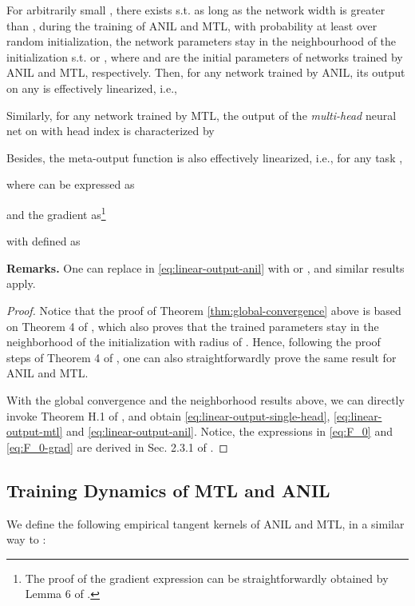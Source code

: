 \documentclass{article}
\begin{document}
\begin{corollary}\label{corollary:linearization}
For arbitrarily small , there exists  s.t. as long as the network width  is greater than , during the training of ANIL and MTL, with probability at least  over random initialization, the network parameters stay in the neighbourhood of the initialization s.t.  or , where  and  are the initial parameters of networks trained by ANIL and MTL, respectively. Then, for any network trained by ANIL, its output on any  is effectively linearized, i.e.,
    
Similarly, for any network trained by MTL, the output of the \textit{multi-head} neural net on  with head index  is characterized by
    
Besides, the meta-output function is also effectively linearized, i.e., for any task ,
    
where  can be expressed as
    
and the gradient  as\footnote{The proof of the gradient expression can be straightforwardly obtained by Lemma 6 of \cite{meta-ntk}.}
    
    with  defined as 
    
\end{corollary}
\textbf{Remarks.} One can replace  in \eqref{eq:linear-output-anil} with  or , and similar results apply.
\begin{proof}
    Notice that the proof of Theorem \ref{thm:global-convergence} above is based on Theorem 4 of \citet{meta-ntk}, which also proves that the trained parameters stay in the neighborhood of the initialization with radius of . Hence, following the proof steps of Theorem 4 of \citet{meta-ntk}, one can also straightforwardly prove the same result for ANIL and MTL.

    With the global convergence and the neighborhood results above, we can directly invoke Theorem H.1 of \citet{lee2019wide}, and obtain \eqref{eq:linear-output-single-head}, \eqref{eq:linear-output-mtl} and \eqref{eq:linear-output-anil}. Notice, the expressions in \eqref{eq:F_0} and \eqref{eq:F_0-grad} are derived in Sec. 2.3.1 of \citet{lee2019wide}.
\end{proof}

\subsection{Training Dynamics of MTL and ANIL}\label{supp:proof:dynamics}


\begin{definition} We define the following empirical tangent kernels of ANIL and MTL, in a similar way to \cite{meta-ntk,lee2019wide}:
    
\end{definition}
\end{document}
